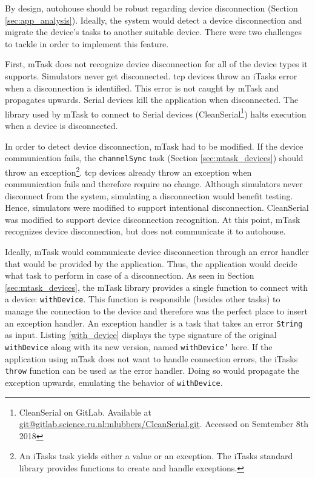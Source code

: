 By design, \gls{autohouse} should be robust regarding device disconnection (Section \ref{sec:app_analysis}). Ideally, the system would detect a device disconnection and migrate the device's tasks to another suitable device. There were two challenges to tackle in order to implement this feature. 

First, \gls{mTask} does not recognize device disconnection for all of the device types it supports. Simulators never get disconnected. \acs{tcp} devices throw an \gls{iTasks} error when a disconnection is identified. This error is not caught by mTask and propagates upwards. Serial devices kill the application when disconnected. The library used by \gls{mTask} to connect to Serial devices (CleanSerial\footnote{CleanSerial on GitLab. Available at \url{git@gitlab.science.ru.nl:mlubbers/CleanSerial.git}. Accessed on Semtember 8th 2018}) halts execution when a device is disconnected. 

In order to detect device disconnection, \gls{mTask} had to be modified. If the device communication fails, the \texttt{channelSync} task (Section \ref{sec:mtask_devices}) should throw an exception\footnote{An \gls{iTasks} task yields either a value or an exception. The \gls{iTasks} standard library provides functions to create and handle exceptions.}. \acs{tcp} devices already throw an exception when communication fails and therefore require no change. Although simulators never disconnect from the system, simulating a disconnection would benefit testing. Hence, simulators were modified to support intentional disconnection. CleanSerial was modified to support device disconnection recognition. At this point, \gls{mTask} recognizes device disconnection, but does not communicate it to \gls{autohouse}. 

Ideally, \gls{mTask} would communicate device disconnection through an error handler that would be provided by the application. Thus, the application would decide what task to perform in case of a disconnection. As seen in Section \ref{sec:mtask_devices}, the \gls{mTask} library provides a single function to connect with a device: \texttt{withDevice}. This function is responsible (besides other tasks) to manage the connection to the device and therefore was the perfect place to insert an exception handler. An exception handler is a task that takes an error \texttt{String} as input. Listing \ref{with_device} displays the type signature of the original \texttt{withDevice} along with its new version, named \texttt{withDevice'} here. If the application using \gls{mTask} does not want to handle connection errors, the \gls{iTasks} \texttt{throw} function can be used as the error handler. Doing so would propagate the exception upwards, emulating the behavior of \texttt{withDevice}.

